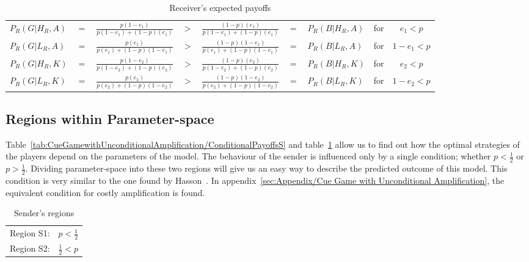 \documentclass[a4paper,12pt]{article}
\numberwithin{equation}{section}
\begin{document}
\begin{table}[h]
\begin{center}
\setlength{\tabcolsep}{.32em}
\begin{tabular}{lccccclcc}
$P_{R}(G|H_{R},A)$ & $=$ & $\frac{p(1-e_{1})}{p(1-e_{1})+(1-p)(e_{1})}$ & $>$ & $\frac{(1-p)(e_{1})}{p(1-e_{1})+(1-p)(e_{1})}$ & $=$ & $P_{R}(B|H_{R},A)$ & for & $e_{1}<p$\\
$P_{R}(G|L_{R},A)$ & $=$ & $\frac{p(e_{1})}{p(e_{1})+(1-p)(1-e_{1})}$ & $>$ & $\frac{(1-p)(1-e_{1})}{p(e_{1})+(1-p)(1-e_{1})}$ & $=$ & $P_{R}(B|L_{R},A)$ & for & $1-e_{1}<p$\\
$P_{R}(G|H_{R},K)$ & $=$ & $\frac{p(1-e_{2})}{p(1-e_{2})+(1-p)(e_{2})}$ & $>$ & $\frac{(1-p)(e_{2})}{p(1-e_{2})+(1-p)(e_{2})}$ & $=$ & $P_{R}(B|H_{R},K)$ & for & $e_{2}<p$\\
$P_{R}(G|L_{R},K)$ & $=$ & $\frac{p(e_{2})}{p(e_{2})+(1-p)(1-e_{2})}$ & $>$ & $\frac{(1-p)(1-e_{2})}{p(e_{2})+(1-p)(1-e_{2})}$ & $=$ & $P_{R}(B|L_{R},K)$ & for & $1-e_{2}<p$
\end{tabular}
\end{center}
\caption{Receiver's expected payoffs}
\label{tab:CueGamewithUnconditionalAmplification/ConditionalPayoffsR}
\end{table}


\subsection{Regions within Parameter-space}
\label{sec:Cue Game with Unconditional Amplification/Regions}

Table~\ref{tab:CueGamewithUnconditionalAmplification/ConditionalPayoffsS} and table~\ref{tab:CueGamewithUnconditionalAmplification/ConditionalPayoffsR} allow us to find out how the optimal strategies of the players depend on the parameters of the model. The behaviour of the sender is influenced only by a single condition; whether $p<\frac{1}{2}$ or $p>\frac{1}{2}$. Dividing parameter-space into these two regions will give us an easy way to describe the predicted outcome of this model. This condition is very similar to the one found by Hasson~\cite{Hasson1989}. In appendix~\ref{sec:Appendix/Cue Game with Unconditional Amplification}, the equivalent condition for costly amplification is found.

\begin{table}[h]
\begin{center}
\begin{tabular}{lc}
Region S1: & $p<\frac{1}{2}$\\
Region S2: & $\frac{1}{2}<p$
\end{tabular}
\end{center}
\caption{Sender's regions}
\label{tab:CueGamewithUnconditionalAmplification/RegionsS}
\end{table}
\end{document}
